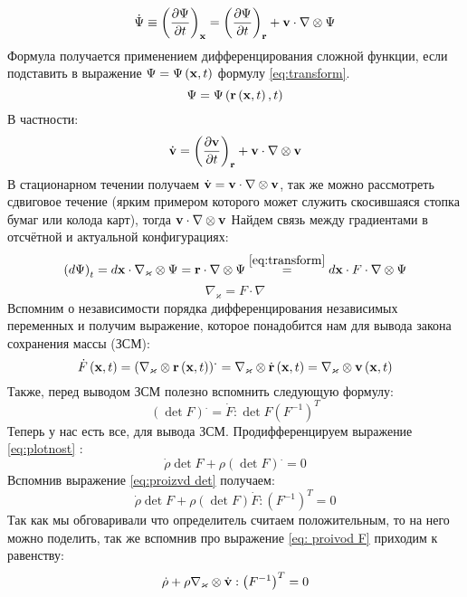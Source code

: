 \documentclass[a4papper, 14pt]{book}
\renewcommand{\kappa}{\ensuremath{\varkappa}}
\newcommand{\diad}{\ensuremath\otimes}
\newcommand{\mf}[1]{\ensuremath\mathbf{#1}}
\theoremstyle{plain} %
\theoremstyle{definition} %
\theoremstyle{remark} %
\begin{document}
	\begin{equation}
	\dot{\Psi} \equiv \left(\dfrac{\partial\Psi}{\partial t}\right)_{\mf{x}} = \left(\dfrac{\partial\Psi}{\partial t}\right)_{\mf{r}} +	\mf{v}\cdot\nabla\diad\Psi
	\end{equation}
	Формула получается применением дифференцирования сложной функции, если подставить в выражение $\Psi = \Psi\left(\mf{x}, t\right)$ формулу \eqref{eq:transform}.
	$$
	\Psi = \Psi\left(\mf{r}\left(\mf{x}, t\right), t\right)
	$$
	В частности:
	$$
	\dot{\mf{v}} = \left(\dfrac{\partial \mf{v}}{\partial t}\right)_{\mf{r}} + \mf{v}\cdot\nabla\diad\mf{v}
	$$
	В стационарном течении получаем $\dot{\mf{v}}=\mf{v}\cdot\nabla\diad\mf{v}$, так же можно рассмотреть сдвиговое течение (ярким примером которого может служить скосившаяся стопка бумаг или колода карт), тогда $\mf{v}\cdot\nabla\diad\mf{v}$
	Найдем связь между градиентами в отсчётной и актуальной конфигурациях:
	$$
	\left(d\Psi\right)_t = d\mf{x}\cdot\nabla_{\kappa}\diad\Psi=\mf{r}\cdot\nabla\diad\Psi\stackrel{\eqref{eq:transform}}=d\mf{x}\cdot	F\cdot\nabla\diad\Psi
	$$
	\begin{equation}\label{eq: gradients}
	\nabla_{\kappa} = F\cdot\nabla
	\end{equation}
	Вспомним о независимости порядка дифференцирования независимых переменных и получим выражение, которое понадобится нам для вывода закона сохранения массы (ЗСМ):
	\begin{equation}\label{eq: proivod F}
	\dot{F}\left(\mf{x}, t\right) =\left(\nabla_{\kappa}\diad\mf{r}\left(\mf{x},	t\right)\right)^{\displaystyle .} = 		\nabla_{\kappa}\diad\dot{\mf{r}}\left(\mf{x}, t\right) = \nabla_{\kappa}\diad 	\mf{v}\left(\mf{x}, t\right) 
	\end{equation}
	Также, перед выводом ЗСМ полезно вспомнить следующую формулу:
	\begin{equation}\label{eq:proizvd det}
	\left(\det F\right)^{\displaystyle .} = \dot{F}:\det F\left(F^{-1}\right)^T
	\end{equation}
	Теперь у нас есть все, для вывода ЗСМ. Продифференцируем выражение \eqref{eq:plotnost} :
	$$
	\dot{\rho}\det F + \rho\left(\det F\right)^{\displaystyle .} = 0
	$$
	Вспомнив выражение \eqref{eq:proizvd det} получаем:
	$$
	\dot{\rho}\det F + \rho\left(\det F\right)\dot{F}:\left(F^{-1}\right)^T = 0
	$$
	Так как мы обговаривали что определитель считаем положительным, то на него можно поделить, так же вспомнив про выражение \eqref{eq: proivod F} приходим к равенству:
	$$
	\dot{\rho} + \rho\nabla_{\kappa}\diad\dot{\mf{v}}:\left(F^{-1}\right)^T = 0
	$$
\end{document}
